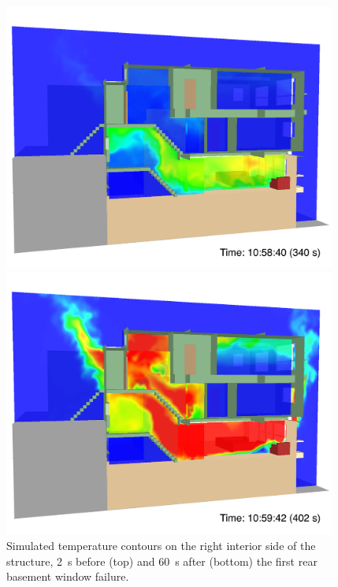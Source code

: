 \documentclass[12pt,oneside]{book}
\begin{document}
\begin{figure}[!ht]
\includegraphics[width=4.3in]{../Figures/SMV_Temp_340_s}


\includegraphics[width=4.3in]{../Figures/SMV_Temp_402_s}


\caption[Simulated temperature contours on the right interior side of the structure.]
{Simulated temperature contours on the right interior side of the structure, 2~s before (top) and 60~s after (bottom) the first rear basement window failure.}
\label{fig:smv_temperature}
\end{figure}


\clearpage
\end{document}
